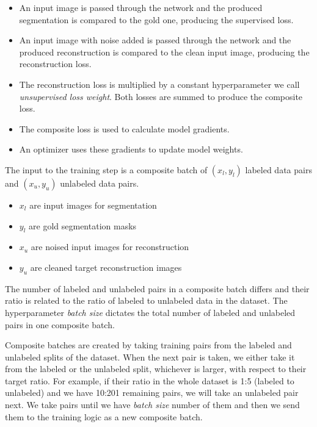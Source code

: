 \begin{itemize}
    \item An input image is passed through the network and the produced segmentation is compared to the gold one, producing the supervised loss.
    \item An input image with noise added is passed through the network and the produced reconstruction is compared to the clean input image, producing the reconstruction loss.
    \item The reconstruction loss is multiplied by a constant hyperparameter we call \emph{unsupervised loss weight}. Both losses are summed to produce the composite loss.
    \item The composite loss is used to calculate model gradients.
    \item An optimizer uses these gradients to update model weights.
\end{itemize}

The input to the training step is a composite batch of $(x_l, y_l)$ labeled data pairs and $(x_u, y_u)$ unlabeled data pairs.

\begin{itemize}
    \item $x_l$ are input images for segmentation
    \item $y_l$ are gold segmentation masks
    \item $x_u$ are noised input images for reconstruction
    \item $y_u$ are cleaned target reconstruction images
\end{itemize}

The number of labeled and unlabeled pairs in a composite batch differs and their ratio is related to the ratio of labeled to unlabeled data in the dataset. The hyperparameter \emph{batch size} dictates the total number of labeled and unlabeled pairs in one composite batch.


Composite batches are created by taking training pairs from the labeled and unlabeled splits of the dataset. When the next pair is taken, we either take it from the labeled or the unlabeled split, whichever is larger, with respect to their target ratio. For example, if their ratio in the whole dataset is 1:5 (labeled to unlabeled) and we have 10:201 remaining pairs, we will take an unlabeled pair next. We take pairs until we have \emph{batch size} number of them and then we send them to the training logic as a new composite batch.

